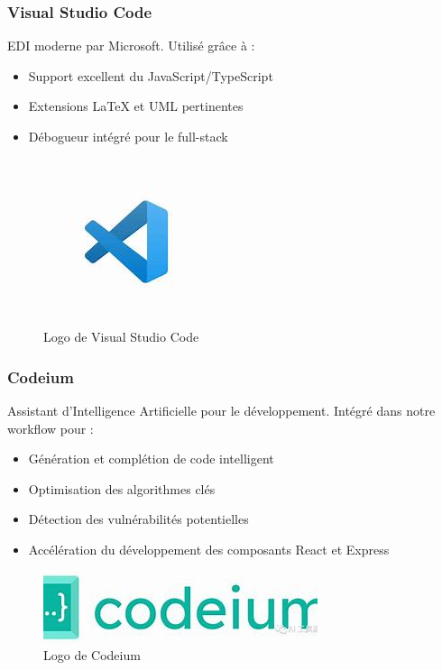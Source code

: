\documentclass[12pt]{report}
\begin{document}
\subsubsection{Visual Studio Code}
EDI moderne par Microsoft. Utilisé grâce à :
\begin{itemize}
    \item Support excellent du JavaScript/TypeScript
    \item Extensions LaTeX et UML pertinentes
    \item Débogueur intégré pour le full-stack
\end{itemize}

\begin{figure}[H]
    \centering
    \includegraphics[width=0.5\linewidth]{./imgs/vscodeLogo.jpg}
    \caption{Logo de Visual Studio Code}
    \label{fig:vscode}
\end{figure}

\subsubsection{Codeium}
Assistant d'Intelligence Artificielle pour le développement. Intégré dans notre workflow pour :
\begin{itemize}
    \item Génération et complétion de code intelligent
    \item Optimisation des algorithmes clés
    \item Détection des vulnérabilités potentielles
    \item Accélération du développement des composants React et Express
\end{itemize}

\begin{figure}[H]
    \centering
    \includegraphics[width=0.5\linewidth]{./imgs/codeiumLogo.jpg}
    \caption{Logo de Codeium}
    \label{fig:codeium}
\end{figure}
\end{document}
